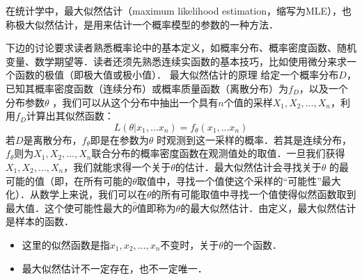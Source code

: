 \begin{issues}
\issueTODO
\end{issues}
在统计学中，最大似然估计（maximum likelihood estimation，缩写为MLE），也称极大似然估计，是用来估计一个概率模型的参数的一种方法．

下边的讨论要求读者熟悉概率论中的基本定义，如概率分布、概率密度函数、随机变量、数学期望等．读者还须先熟悉连续实函数的基本技巧，比如使用微分来求一个函数的极值（即极大值或极小值）．
最大似然估计的原理
给定一个概率分布$D $，已知其概率密度函数（连续分布）或概率质量函数（离散分布）为$f_D $，以及一个分布参数$\theta $ ，我们可以从这个分布中抽出一个具有$n$个值的采样$X_{1},X_{2},... ,X_{n} $，利用$f_D$计算出其似然函数：
$$
L(\theta|x_1,...x_n ) = f_{\theta }(x_1,...x_n )
$$
若$D$是离散分布，$f_{\theta }$即是在参数为$\theta$ 时观测到这一采样的概率．若其是连续分布，$f_{\theta }$则为$X_{1},X_{2},... ,X_{n} $联合分布的概率密度函数在观测值处的取值．一旦我们获得$X_{1},X_{2},... ,X_{n} $，我们就能求得一个关于$\theta $的估计．最大似然估计会寻找关于$\theta$ 的最可能的值（即，在所有可能的$\theta $取值中，寻找一个值使这个采样的“可能性”最大化）．从数学上来说，我们可以在$\theta $的所有可能取值中寻找一个值使得似然函数取到最大值．这个使可能性最大的$\widehat{\theta}$值即称为$\theta $的最大似然估计．由定义，最大似然估计是样本的函数．
\begin{itemize}
\item 这里的似然函数是指$x_1,x_2,\ldots,x_n$不变时，关于$\theta $的一个函数．
\item 最大似然估计不一定存在，也不一定唯一．
\end{itemize}